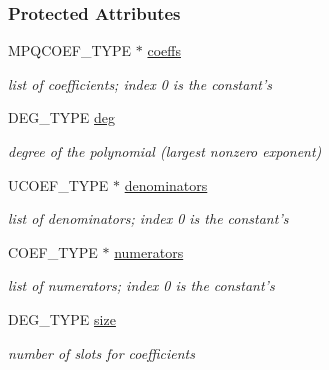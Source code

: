 \subsubsection*{Protected Attributes}
\begin{DoxyCompactItemize}
\item 
\mbox{\label{group__polygroup_a6137f99c673dcbf4dadab7dedca067a9}} 
M\+P\+Q\+C\+O\+E\+F\+\_\+\+T\+Y\+PE $\ast$ \hyperlink{group__polygroup_a6137f99c673dcbf4dadab7dedca067a9}{coeffs}
\begin{DoxyCompactList}\small\item\em list of coefficients; index 0 is the constant's \end{DoxyCompactList}\item 
\mbox{\label{group__polygroup_a1c6da3f7245cd50ec18c5877202fd8f6}} 
D\+E\+G\+\_\+\+T\+Y\+PE \hyperlink{group__polygroup_a1c6da3f7245cd50ec18c5877202fd8f6}{deg}
\begin{DoxyCompactList}\small\item\em degree of the polynomial (largest nonzero exponent) \end{DoxyCompactList}\item 
\mbox{\label{group__polygroup_a52dd896ab7091806cd99431c473ba6d0}} 
U\+C\+O\+E\+F\+\_\+\+T\+Y\+PE $\ast$ \hyperlink{group__polygroup_a52dd896ab7091806cd99431c473ba6d0}{denominators}
\begin{DoxyCompactList}\small\item\em list of denominators; index 0 is the constant's \end{DoxyCompactList}\item 
\mbox{\label{group__polygroup_ab3f8f2b676e0795601dc037c4d12e078}} 
C\+O\+E\+F\+\_\+\+T\+Y\+PE $\ast$ \hyperlink{group__polygroup_ab3f8f2b676e0795601dc037c4d12e078}{numerators}
\begin{DoxyCompactList}\small\item\em list of numerators; index 0 is the constant's \end{DoxyCompactList}\item 
\mbox{\label{group__polygroup_ac1150612197de4b6cb20463fd0c33134}} 
D\+E\+G\+\_\+\+T\+Y\+PE \hyperlink{group__polygroup_ac1150612197de4b6cb20463fd0c33134}{size}
\begin{DoxyCompactList}\small\item\em number of slots for coefficients \end{DoxyCompactList}\end{DoxyCompactItemize}
